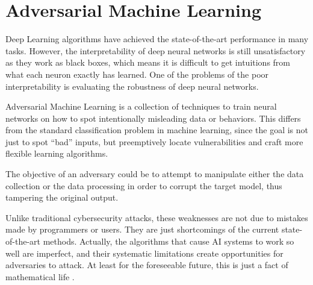 \section{Adversarial Machine Learning}\label{sec:adversarial-machine-learning}
Deep Learning algorithms have achieved the state-of-the-art performance in many tasks. 
However, the interpretability of deep neural networks is still unsatisfactory as they work as black boxes, which means it is difficult to get intuitions from what each neuron exactly has learned. 
One of the problems of the poor interpretability is evaluating the robustness of deep neural networks. 


Adversarial Machine Learning is a collection of techniques to train neural networks on how to spot intentionally misleading data or behaviors. 
This differs from the standard classification problem in machine learning, since the goal is not just to spot “bad” inputs, but preemptively locate vulnerabilities and craft more flexible learning algorithms.

The objective of an adversary
could be to attempt to manipulate either the data collection or
the data processing in order to corrupt the target model, thus
tampering the original output. 

Unlike traditional cybersecurity
attacks, these weaknesses are not due to mistakes made by programmers or users. They are
just shortcomings of the current state-of-the-art
methods. Actually, the algorithms that
cause AI systems to work so well are imperfect,
and their systematic limitations create opportunities for adversaries to attack. At least for the foreseeable future, this is just
a fact of mathematical life \cite{Comiter2019AttackingAI}.

